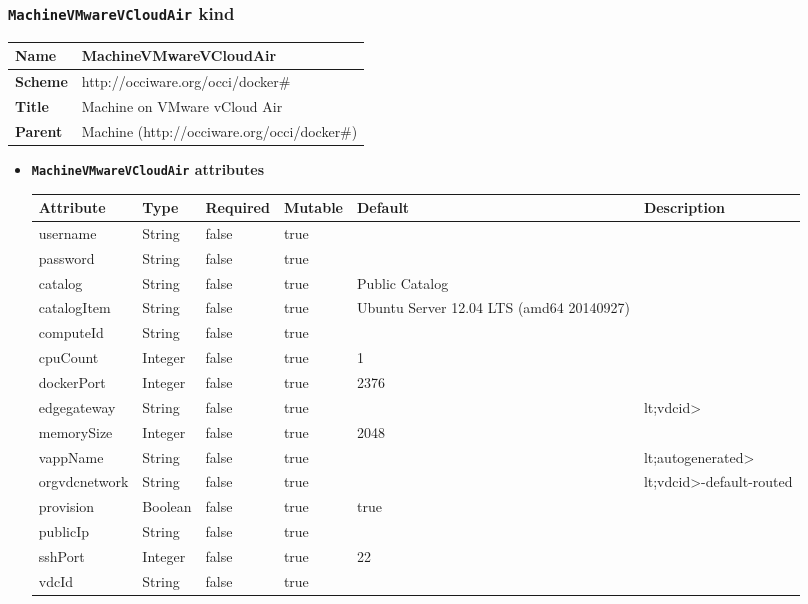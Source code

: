 \subsubsection{\texttt{MachineVMwareVCloudAir} kind}
\begin{center}
\begin{tabular}{|l|l|}
  \hline
  \textbf{Name} & MachineVMwareVCloudAir \\
  \hline  
  \textbf{Scheme} & http://occiware.org/occi/docker\# \\
  \hline
  \textbf{Title} & Machine on VMware vCloud Air \\
  \hline
  \textbf{Parent} & Machine (http://occiware.org/occi/docker\#) \\
  \hline
\end{tabular}
\end{center}
\begin{itemize}
\item \textbf{\texttt{MachineVMwareVCloudAir} attributes}

\begin{tabularx}{\textwidth}{|l|l|p{1.4cm}|p{1.3cm}|l|X|}
  \hline
  \textbf{Attribute} & \textbf{Type} & \textbf{Required} & \textbf{Mutable} & \textbf{Default} & \textbf{Description} \\
  \hline  
  username & String & false & true &  &  \\
  \hline
  password & String & false & true &  &  \\
  \hline
  catalog & String & false & true & Public Catalog &  \\
  \hline
  catalogItem & String & false & true & Ubuntu Server 12.04 LTS (amd64 20140927) &  \\
  \hline
  computeId & String & false & true &  &  \\
  \hline
  cpuCount & Integer & false & true & 1 &  \\
  \hline
  dockerPort & Integer & false & true & 2376 &  \\
  \hline
  edgegateway & String & false & true & &lt;vdcid> &  \\
  \hline
  memorySize & Integer & false & true & 2048 &  \\
  \hline
  vappName & String & false & true & &lt;autogenerated> &  \\
  \hline
  orgvdcnetwork & String & false & true & &lt;vdcid>-default-routed &  \\
  \hline
  provision & Boolean & false & true & true &  \\
  \hline
  publicIp & String & false & true &  &  \\
  \hline
  sshPort & Integer & false & true & 22 &  \\
  \hline
  vdcId & String & false & true &  &  \\
  \hline
\end{tabularx}
\end{itemize}



